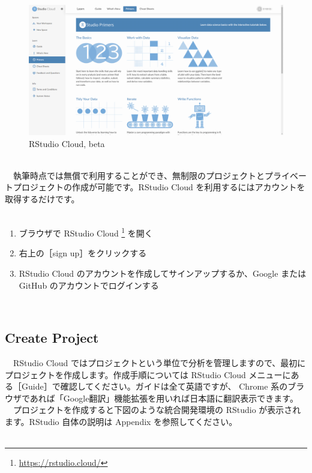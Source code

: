 \documentclass[
  12pt,
]{book}
\DeclareRobustCommand{\href}[2]{#2\footnote{\url{#1}}}
\providecommand{\tightlist}{%
  \setlength{\itemsep}{0pt}\setlength{\parskip}{0pt}}
\begin{document}
\begin{figure}[H]

{\centering \includegraphics[width=0.8\linewidth,]{fig/RStudio/RSCloud_00} 

}

\caption{RStudio Cloud, beta}\label{fig:unnamed-chunk-139}
\end{figure}

　\\
　執筆時点では無償で利用することができ、無制限のプロジェクトとプライベートプロジェクトの作成が可能です。RStudio Cloud を利用するにはアカウントを取得するだけです。\\
　

\begin{enumerate}
\def\labelenumi{\arabic{enumi}.}
\tightlist
\item
  ブラウザで \href{https://rstudio.cloud/}{RStudio Cloud } を開く
\item
  右上の［sign up］をクリックする
\item
  RStudio Cloud のアカウントを作成してサインアップするか、Google または GitHub のアカウントでログインする
\end{enumerate}

　

\hypertarget{create-project}{%
\subsection{Create Project}\label{create-project}}

　RStudio Cloud ではプロジェクトという単位で分析を管理しますので、最初にプロジェクトを作成します。作成手順については RStudio Cloud メニューにある［Guide］で確認してください。ガイドは全て英語ですが、 Chrome 系のブラウザであれば「Google翻訳」機能拡張を用いれば日本語に翻訳表示できます。\\
　プロジェクトを作成すると下図のような統合開発環境の RStudio が表示されます。RStudio 自体の説明は Appendix を参照してください。\\
　\\
\end{document}

